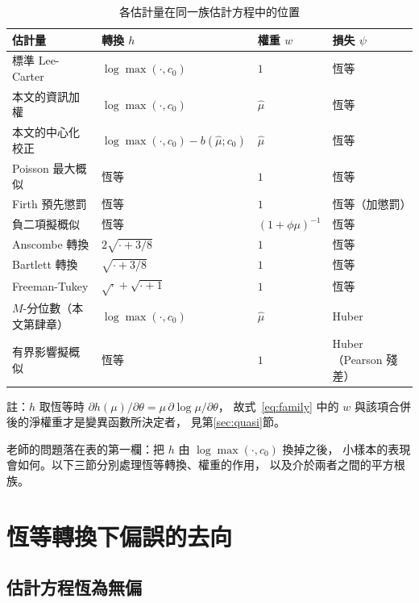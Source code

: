 \documentclass[UTF8, fontset=macnew, a4paper, 12pt]{ctexart}
\begin{document}
\begin{table}[H]
\centering
\caption{各估計量在同一族估計方程中的位置}
\small
\renewcommand{\arraystretch}{1.15}
\begin{tabular}{llll}
\toprule
估計量 & 轉換 $h$ & 權重 $w$ & 損失 $\psi$\\
\midrule
標準 Lee-Carter \citep{lee1992} & $\log\max(\cdot,c_0)$ & $1$ & 恆等\\
本文的資訊加權 & $\log\max(\cdot,c_0)$ & $\hat\mu$ & 恆等\\
本文的中心化校正 & $\log\max(\cdot,c_0)-b(\hat\mu;c_0)$ & $\hat\mu$ & 恆等\\
Poisson 最大概似 \citep{brouhns2002} & 恆等 & $1$ & 恆等\\
Firth 預先懲罰 \citep{firth1993} & 恆等 & $1$ & 恆等（加懲罰）\\
負二項擬概似 & 恆等 & $(1+\phi\mu)^{-1}$ & 恆等\\
Anscombe 轉換 \citep{anscombe1948} & $2\sqrt{\cdot+3/8}$ & $1$ & 恆等\\
Bartlett 轉換 \citep{bartlett1936} & $\sqrt{\cdot+3/8}$ & $1$ & 恆等\\
Freeman-Tukey \citep{freeman1950} & $\sqrt{\cdot}+\sqrt{\cdot+1}$ & $1$ & 恆等\\
$M$-分位數（本文第肆章） & $\log\max(\cdot,c_0)$ & $\hat\mu$ & Huber\\
有界影響擬概似 \citep{cantoni2001} & 恆等 & $1$ & Huber（Pearson 殘差）\\
\bottomrule
\end{tabular}

\vspace{2pt}
\parbox{0.92\textwidth}{\footnotesize 註：$h$ 取恆等時
$\partial h(\mu)/\partial\theta=\mu\,\partial\log\mu/\partial\theta$，
故式~\eqref{eq:family} 中的 $w$ 與該項合併後的淨權重才是變異函數所決定者，
見第\ref{sec:quasi}節。}
\label{tab:family}
\end{table}

老師的問題落在表的第一欄：把 $h$ 由 $\log\max(\cdot,c_0)$ 換掉之後，
小樣本的表現會如何。以下三節分別處理恆等轉換、權重的作用，
以及介於兩者之間的平方根族。

\section{恆等轉換下偏誤的去向}\label{sec:identity}

\subsection{估計方程恆為無偏}\label{subsec:unbiased}
\end{document}
